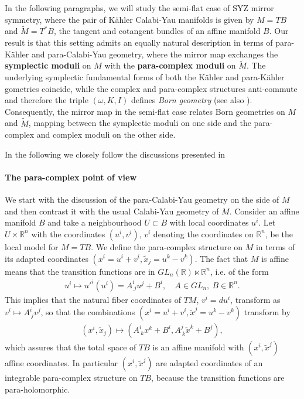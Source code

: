 \documentclass[letterpaper,12pt]{article}
\newcommand{\RR}{\mathbb{R}}
\newcommand{\xt}{{\tilde{x}}}
\newcommand{\Mt}{\tl{M}}
\def\tl{\tilde}
\theoremstyle{definition}
\theoremstyle{remark}
\theoremstyle{examples}
\begin{document}
In the following paragraphs, we will study the semi-flat case of SYZ mirror symmetry, where the pair of K\"ahler Calabi-Yau manifolds is given by $M=TB$ and $\Mt=T^*B$, the tangent and cotangent bundles of an affine manifold $B$. Our result is that this setting admits an equally natural description in terms of para-K\"ahler and para-Calabi-Yau geometry, where the mirror map exchanges the {\bf symplectic moduli} on $M$ with the {\bf para-complex moduli} on $\Mt$. The underlying symplectic fundamental forms of both the K\"ahler and para-K\"ahler gometries coincide, while the complex and para-complex structures anti-commute and therefore the triple $(\omega,K,I)$ defines {\it Born geometry} \cite{freidel2014born,Freidel:2018tkj,mythesis} (see also \cite{Marotta:2018myj,Hassler:2019wvn,Marotta:2018swj,Marotta:2019eqc}). Consequently, the mirror map in the semi-flat case relates Born geometries on $M$ and $\Mt$, mapping between the symplectic moduli on one side and the para-complex and complex moduli on the other side.

In the following we closely follow the discussions presented in \cite{mythesis,mirror_w-o_corrections,hitchin1997moduli}


\paragraph{The para-complex point of view} We start with the discussion of the para-Calabi-Yau geometry on the side of $M$ and then contrast it with the usual Calabi-Yau geometry of $M$. Consider an affine manifold $B$ and take a neighbourhood $U\subset B$ with local coordinates $u^i$. Let $U\times \RR^n$ with the coordinates $(u^i,v^i)$, $v^i$ denoting the coordinates on $\RR^n$, be the local model for $M=TB$. We define the para-complex structure on $M$ in terms of its adapted coordinates $(x^i=u^i+v^i,\xt_j=u^k-v^k)$. The fact that $M$ is affine means that the transition functions are in $GL_n(\RR)\ltimes \RR^n$, i.e. of the form
\begin{align*}
    u^i\mapsto u'^i(u^i)=A_{\ j}^{i}u^j+B^i,\quad A \in GL_n,\ B\in \RR^n.
\end{align*}
This implies that the natural fiber coordinates of $TM$, $v^i=du^i$,  transform as $v^i\mapsto A^i_{\ j}v^j$, so that the combinations $(x^i=u^i+v^i,\xt^j=u^k-v^k)$ transform by
\begin{align*}
    (x^i,\xt_j)\mapsto (A_{\ k}^{i}x^k+B^i,A_{\ k}^{j}\xt^k+B^j),
\end{align*}
which assures that the total space of $TB$ is an affine manifold with $(x^i,\xt^j)$ affine coordinates. In particular $(x^i,\xt^j)$ are adapted coordinates of an integrable para-complex structure on $TB$, because the transition functions are para-holomorphic.
\end{document}
